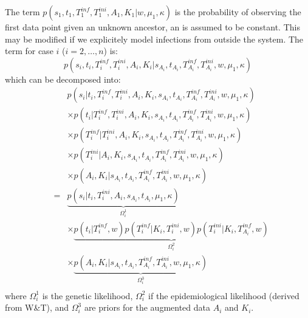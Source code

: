 \documentclass[10pt]{article}
\begin{document}
The term $p(s_1, t_1, T_1^{inf}, T_1^{ini}, A_1, K_1 | w, \mu_1, \kappa)$ is the probability of observing the first data point given an unknown ancestor, an is assumed to be constant.
This may be modified if we explicitely model infections from outside the system.
The term for case $i$ ($i=2,\ldots,n$) is:
\begin{equation}
 p(s_i, t_i, T_i^{inf},T_i^{ini}, A_i, K_i| s_{A_i}, t_{A_i}, T_{A_i}^{inf}, T_{A_i}^{ini}, w, \mu_1, \kappa )
\end{equation}
which can be decomposed into:
\begin{eqnarray}
& & p(s_i | t_i, T_i^{inf}, T_i^{ini}, A_i, K_i, s_{A_i}, t_{A_i}, T_{A_i}^{inf}, T_{A_i}^{ini}, w, \mu_1, \kappa) \nonumber \\
& &  \times  p(t_i | T_i^{inf}, T_i^{ini}, A_i, K_i, s_{A_i}, t_{A_i}, T_{A_i}^{inf}, T_{A_i}^{ini}, w, \mu_1, \kappa) \nonumber \\
& & \times  p(T_i^{inf}| T_i^{ini}, A_i, K_i, s_{A_i}, t_{A_i}, T_{A_i}^{inf}, T_{A_i}^{ini}, w, \mu_1, \kappa) \nonumber \\
& & \times  p(T_i^{ini}| A_i, K_i, s_{A_i}, t_{A_i}, T_{A_i}^{inf}, T_{A_i}^{ini}, w, \mu_1, \kappa) \nonumber \\
& & \times  p(A_i, K_i| s_{A_i}, t_{A_i}, T_{A_i}^{inf}, T_{A_i}^{ini}, w, \mu_1, \kappa) \nonumber \\
& = & 
\underbrace{p(s_i | t_i, T_i^{ini}, A_i, s_{A_i}, t_{A_i}, \mu_1, \kappa)}_{\Omega_i^1} \nonumber \\
& &  \times  \underbrace{p(t_i | T_i^{inf}, w) 
 p(T_i^{inf}| K_i, T_i^{ini}, w)
 p(T_i^{ini}| K_i, T_{A_i}^{inf}, w)}_{\Omega_i^2} \nonumber \\
& & \times  \underbrace{p(A_i, K_i| s_{A_i}, t_{A_i}, T_{A_i}^{inf}, T_{A_i}^{ini}, w, \mu_1, \kappa)}_{\Omega_i^3}\nonumber \\
\end{eqnarray}
\noindent where $\Omega_i^1$ is the genetic likelihood, $\Omega_i^2$ if the epidemiological likelihood (derived from W\&T), and $\Omega_i^3$ are priors for the augmented data $A_i$ and $K_i$.
\\
\end{document}
